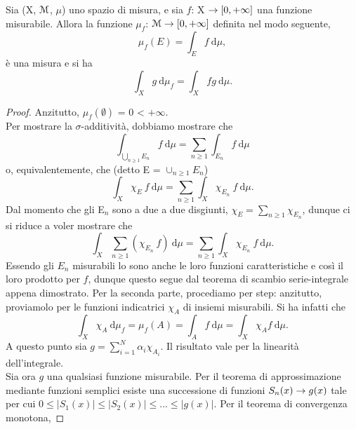 \documentclass[Completo.tex]{subfiles}
\begin{document}
\begin{eTh}
	Sia (X, $\eu[M]$, $\mu$) uno spazio di misura, e sia $f$: X $\rightarrow [0, +\infty]$ una funzione misurabile. Allora la funzione $\mu_f$: $\eu[M] \ra [0, +\infty]$ definita nel modo seguente,
	\begin{equation*}
	\mu_f(E) = \int_E f \ \mathrm{d}\mu,
	\end{equation*}
	è una misura e si ha
	\begin{equation*}
	\int_X g \ \mathrm{d}\mu_f = \int_X fg \ \mathrm{d}\mu.
	\end{equation*}
\end{eTh}
\begin{proof}
	Anzitutto, $\mu_f(\emptyset)$ = 0 < $+\infty$. \\
	Per mostrare la $\sigma$-additività, dobbiamo mostrare che
	\begin{equation*}
	\int_{\bigcup\limits_{n\geq1}E_n} f \ \mathrm{d}\mu = \sum_{n\geq 1} \int_{E_n} f \ \mathrm{d}\mu
	\end{equation*}
	o, equivalentemente, che (detto E = $\cup_{n\geq1}E_n$)
	\begin{equation*}
	\int_X \chi_E \ f \ \mathrm{d}\mu = \sum_{n\geq 1} \int_X \chi_{E_n} \ f \ \mathrm{d}\mu.
	\end{equation*}
	Dal momento che gli E$_n$ sono a due a due disgiunti, $\chi_E = \sum_{n\geq 1} \chi_{E_n}$, dunque ci si riduce a voler mostrare che
	\begin{equation*}
	\int_X \sum_{n\geq 1}(\chi_{E_n} \ f) \ \mathrm{d}\mu = \sum_{n\geq 1} \int_X \chi_{E_n} \ f \ \mathrm{d}\mu.
	\end{equation*}
	Essendo gli $E_n$ misurabili lo sono anche le loro funzioni caratteristiche e così il loro prodotto per $f$, dunque questo segue dal teorema di scambio serie-integrale appena dimostrato. Per la seconda parte, procediamo per step: anzitutto, proviamolo per le funzioni indicatrici $\chi_A$ di insiemi misurabili. Si ha infatti che
	\begin{equation*}
	\int_X \chi_A \ \mathrm{d}\mu_f = \mu_f(A) = \int_A f \ \mathrm{d}\mu = \int_X \chi_A f \ \mathrm{d}\mu.
	\end{equation*}
	A questo punto sia $g = \sum_{i=1}^{N} \alpha_i \chi_{A_i}$. Il risultato vale per la linearità dell'integrale. \\
	Sia ora $g$ una qualsiasi funzione misurabile. Per il teorema di approssimazione mediante funzioni semplici esiste una successione di funzioni $S_n(x) \rightarrow g(x)$ tale per cui $0 \leq \vert S_1(x) \vert \leq \vert S_2(x) \vert \leq ... \leq \vert g(x) \vert$. Per il teorema di convergenza monotona,

\end{proof}
\end{document}
